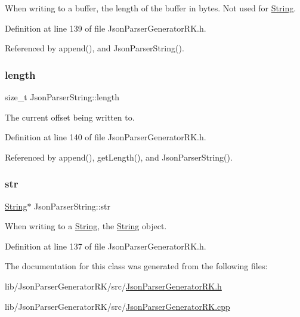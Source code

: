 When writing to a buffer, the length of the buffer in bytes. Not used for \hyperlink{class_string}{String}. 



Definition at line 139 of file Json\+Parser\+Generator\+R\+K.\+h.



Referenced by append(), and Json\+Parser\+String().

\mbox{\label{class_json_parser_string_a2b3a350599c49f6e7e368fc8b508cf6f}} 
\subsubsection{\texorpdfstring{length}{length}}
{\footnotesize\ttfamily size\+\_\+t Json\+Parser\+String\+::length\hspace{0.3cm}{\ttfamily [protected]}}



The current offset being written to. 



Definition at line 140 of file Json\+Parser\+Generator\+R\+K.\+h.



Referenced by append(), get\+Length(), and Json\+Parser\+String().

\mbox{\label{class_json_parser_string_ac98659ff5a56537979b6c60d28648224}} 
\subsubsection{\texorpdfstring{str}{str}}
{\footnotesize\ttfamily \hyperlink{class_string}{String}$\ast$ Json\+Parser\+String\+::str\hspace{0.3cm}{\ttfamily [protected]}}



When writing to a \hyperlink{class_string}{String}, the \hyperlink{class_string}{String} object. 



Definition at line 137 of file Json\+Parser\+Generator\+R\+K.\+h.



The documentation for this class was generated from the following files\+:\begin{DoxyCompactItemize}
\item 
lib/\+Json\+Parser\+Generator\+R\+K/src/\hyperlink{_json_parser_generator_r_k_8h}{Json\+Parser\+Generator\+R\+K.\+h}\item 
lib/\+Json\+Parser\+Generator\+R\+K/src/\hyperlink{_json_parser_generator_r_k_8cpp}{Json\+Parser\+Generator\+R\+K.\+cpp}\end{DoxyCompactItemize}
